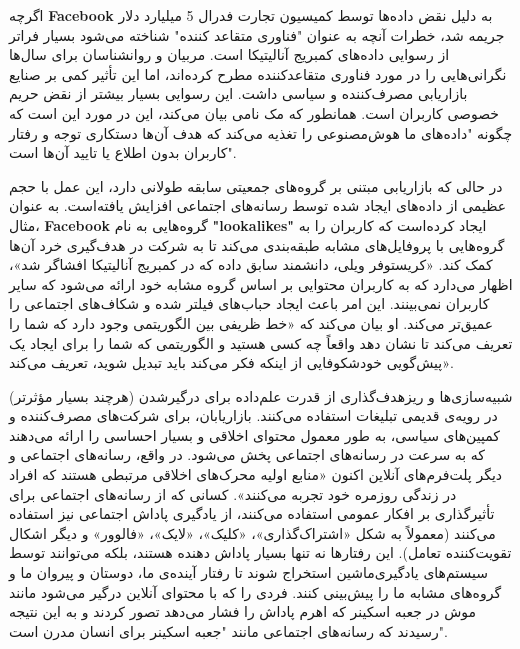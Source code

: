 اگرچه \textenglish{\textbf{Facebook}} به دلیل نقض داده‌ها توسط کمیسیون تجارت فدرال 5 میلیارد دلار جریمه شد، خطرات آنچه به عنوان "فناوری متقاعد کننده" شناخته می‌شود بسیار فراتر از رسوایی داده‌های کمبریج آنالیتیکا است.
مربیان و روانشناسان برای سال‌ها نگرانی‌هایی را در مورد فناوری متقاعدکننده مطرح کرده‌اند، اما این تأثیر کمی بر صنایع بازاریابی مصرف‌کننده و سیاسی داشت.
این رسوایی بسیار بیشتر از نقض حریم خصوصی کاربران است.
همانطور که مک نامی بیان می‌کند، این در مورد این است که چگونه "داده‌های ما هوش‌مصنوعی را تغذیه می‌کند که هدف آن‌ها دستکاری توجه و رفتار کاربران بدون اطلاع یا تایید آن‌ها است".

در حالی که بازاریابی مبتنی بر گروه‌های جمعیتی سابقه طولانی دارد، این عمل با حجم عظیمی از داده‌های ایجاد شده توسط رسانه‌های اجتماعی افزایش یافته‌است.
به عنوان مثال، \textenglish{\textbf{Facebook}} گروه‌هایی به نام \textenglish{\textbf{"lookalikes"}} ایجاد کرده‌است که کاربران را به گروه‌هایی با پروفایل‌های مشابه طبقه‌بندی می‌کند تا به شرکت در هدف‌گیری خرد آن‌ها کمک کند.
«کریستوفر ویلی، دانشمند سابق داده که در کمبریج آنالیتیکا افشاگر شد»، اظهار می‌دارد که به کاربران محتوایی بر اساس گروه مشابه خود ارائه می‌شود که سایر کاربران نمی‌بینند.
این امر باعث ایجاد حباب‌های فیلتر شده و شکاف‌های اجتماعی را عمیق‌تر می‌کند.
او بیان می‌کند که «خط ظریفی بین الگوریتمی وجود دارد که شما را تعریف می‌کند تا نشان دهد واقعاً چه کسی هستید و الگوریتمی که شما را برای ایجاد یک پیش‌گویی خودشکوفایی از اینکه فکر می‌کند باید تبدیل شوید، تعریف می‌کند».

شبیه‌سازی‌ها و ریزهدف‌گذاری از قدرت علم‌داده برای درگیر‌شدن (هرچند بسیار مؤثرتر) در رویه‌ی قدیمی تبلیغات استفاده می‌کنند.
بازاریابان، برای شرکت‌های مصرف‌کننده و کمپین‌های سیاسی، به طور معمول محتوای اخلاقی و بسیار احساسی را ارائه می‌دهند که به سرعت در رسانه‌های اجتماعی پخش می‌شود.
در واقع، رسانه‌های اجتماعی و دیگر پلت‌فرم‌های آنلاین اکنون «منابع اولیه محرک‌های اخلاقی مرتبطی هستند که افراد در زندگی روزمره خود تجربه می‌کنند».
کسانی که از رسانه‌های اجتماعی برای تأثیرگذاری بر افکار عمومی استفاده می‌کنند، از یادگیری پاداش اجتماعی نیز استفاده می‌کنند (معمولاً به شکل «اشتراک‌گذاری»، «کلیک»، «لایک»، «فالوور» و دیگر اشکال تقویت‌کننده تعامل).
این رفتارها نه تنها بسیار پاداش دهنده هستند، بلکه می‌توانند توسط سیستم‌های یادگیری‌ماشین استخراج شوند تا رفتار آینده‌ی ما، دوستان و پیروان ما و گروه‌های مشابه ما را پیش‌بینی کنند.
فردی را که با محتوای آنلاین درگیر می‌شود مانند موش در جعبه اسکینر که اهرم پاداش را فشار می‌دهد تصور کردند و به این نتیجه رسیدند که رسانه‌های اجتماعی مانند "جعبه اسکینر برای انسان مدرن است".

